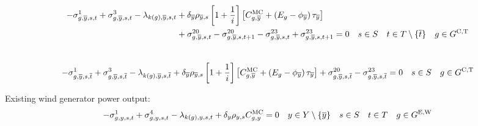 \documentclass{article}
\begin{document}
\begin{align}
-\dMinPowerOutput[\iGenerator,\iYearTerminal,\iScenario,\iInterval] + \dMaxPowerOutputCandidateThermal[\iGenerator,\iYearTerminal,\iScenario,\iInterval] - \dPowerBalance[k(\iGenerator),\iYearTerminal,\iScenario,\iInterval] & + \cDiscountRate[\iYearTerminal] \cScenarioDuration[\iYearTerminal,\iScenario] \left[1 + \frac{1}{\cInterestRate}\right] \left[\cMarginalCost[\iGenerator,\iYearTerminal] + \left(\cEmissionsIntensity - \vBaseline[\iYearTerminal]\right)\vPermitPrice[\iYearTerminal] \right] \nonumber\\
& + \dRampRateUp[\iGenerator,\iYearTerminal,\iScenario,\iInterval] - \dRampRateUp[\iGenerator,\iYearTerminal,\iScenario,\iInterval + 1] - \dRampRateDown[\iGenerator,\iYearTerminal,\iScenario,\iInterval] + \dRampRateDown[\iGenerator,\iYearTerminal,\iScenario,\iInterval + 1] = 0 \quad \iScenario \in \sScenarios \quad \iInterval \in \sIntervals \setminus \{\iIntervalTerminal\} \quad \iGenerator \in \sGeneratorsCandidateThermal \\\nonumber
\end{align}

\begin{equation}
-\dMinPowerOutput[\iGenerator,\iYearTerminal,\iScenario,\iIntervalTerminal] + \dMaxPowerOutputCandidateThermal[\iGenerator,\iYearTerminal,\iScenario,\iIntervalTerminal] - \dPowerBalance[k(\iGenerator),\iYearTerminal,\iScenario,\iIntervalTerminal] + \cDiscountRate[\iYearTerminal] \cScenarioDuration[\iYearTerminal,\iScenario] \left[1 + \frac{1}{\cInterestRate}\right] \left[\cMarginalCost[\iGenerator,\iYearTerminal] + \left(\cEmissionsIntensity - \vBaseline[\iYearTerminal]\right)\vPermitPrice[\iYearTerminal] \right] + \dRampRateUp[\iGenerator,\iYearTerminal,\iScenario,\iIntervalTerminal] - \dRampRateDown[\iGenerator,\iYearTerminal,\iScenario,\iIntervalTerminal] = 0 \quad \iScenario \in \sScenarios \quad \iGenerator \in \sGeneratorsCandidateThermal
\end{equation}

Existing wind generator power output:
\begin{equation}
-\dMinPowerOutput + \dMaxPowerOutputWindExisting - \dPowerBalance[k(\iGenerator),\iYear,\iScenario,\iInterval] + \cDiscountRate \cScenarioDuration\cMarginalCost = 0 \quad \iYear \in \sYears \setminus \{\iYearTerminal\} \quad \iScenario \in \sScenarios \quad \iInterval \in \sIntervals \quad \iGenerator \in \sGeneratorsExistingWind
\end{equation}
\end{document}
